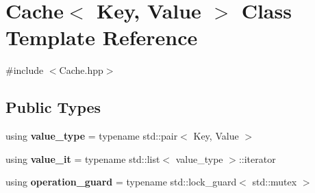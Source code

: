 \hypertarget{classCache}{}\section{Cache$<$ Key, Value $>$ Class Template Reference}
\label{classCache}


{\ttfamily \#include $<$Cache.\+hpp$>$}

\subsection*{Public Types}
\begin{DoxyCompactItemize}
\item 
\mbox{\label{classCache_aba9c0839c657c50ce9147b298278dab9}} 
using {\bfseries value\+\_\+type} = typename std\+::pair$<$ Key, Value $>$
\item 
\mbox{\label{classCache_ae0ecf3d225e5d7ee2b9fbf048727609b}} 
using {\bfseries value\+\_\+it} = typename std\+::list$<$ value\+\_\+type $>$\+::iterator
\item 
\mbox{\label{classCache_a6af783ab93cfb837dde67795cd99a017}} 
using {\bfseries operation\+\_\+guard} = typename std\+::lock\+\_\+guard$<$ std\+::mutex $>$
\end{DoxyCompactItemize}
